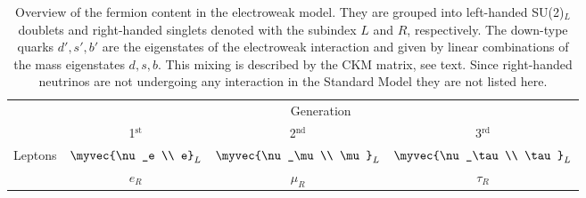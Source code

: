 

\begin{table}[t]
  \caption[Overview of the fermion content in the electroweak model.]{Overview of the fermion content in the electroweak model. They are grouped into left-handed SU(2)$_L$ doublets and right-handed singlets denoted with the subindex $L$ and $R$, respectively. The down-type quarks $d', s', b'$ are the eigenstates of the electroweak interaction and given by linear combinations of the mass eigenstates $d, s, b$. This mixing is described by the CKM matrix, see text. Since right-handed neutrinos are not undergoing any interaction in the Standard Model they are not listed here.}
  \label{tab:ewfermioncontent}
  \centering
  \begin{tabular}{c |@{}| c c c }
    \toprule
                             & \multicolumn{3}{c}{Generation}                                                                       \\
                             & 1$^{\text{st}}$                & 2$^{\text{nd}}$                     & 3$^{\text{rd}}$        \\
    \midrule
    \multirow{3}{*}{Leptons} & \multirow{2}{*}{$\myvec{\nu_e                                                                                                             \\ e}_L$} & \multirow{2}{*}{$\myvec{\nu_\mu \\ \mu}_L$} & \multirow{2}{*}{$\myvec{\nu_\tau \\ \tau}_L$}  \\
                             &                                &                                     &                            \\
                             & $e_R$                          & $\mu_R$                             & $\tau_R$           \\

\end{tabular}
\end{table}
